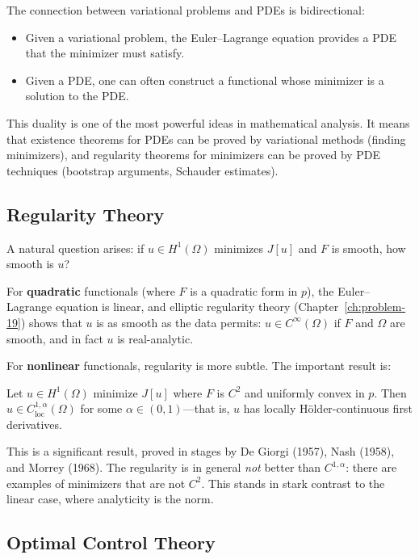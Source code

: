 The connection between variational problems and PDEs is bidirectional:
\begin{itemize}
    \item Given a variational problem, the Euler--Lagrange equation provides a PDE that the minimizer must satisfy.
    \item Given a PDE, one can often construct a functional whose minimizer is a solution to the PDE.
\end{itemize}

This duality is one of the most powerful ideas in mathematical analysis. It means that existence theorems for PDEs can be proved by variational methods (finding minimizers), and regularity theorems for minimizers can be proved by PDE techniques (bootstrap arguments, Schauder estimates).

\subsection{Regularity Theory}

A natural question arises: if $u \in H^1(\Omega)$ minimizes $J[u]$ and $F$ is smooth, how smooth is $u$?

For \textbf{quadratic} functionals (where $F$ is a quadratic form in $p$), the Euler--Lagrange equation is linear, and elliptic regularity theory (Chapter~\ref{ch:problem-19}) shows that $u$ is as smooth as the data permits: $u \in C^\infty(\Omega)$ if $F$ and $\Omega$ are smooth, and in fact $u$ is real-analytic.

For \textbf{nonlinear} functionals, regularity is more subtle. The important result is:

\begin{theorem}\label{thm:interior-regularity}
Let $u \in H^1(\Omega)$ minimize $J[u]$ where $F$ is $C^2$ and uniformly convex in $p$. Then $u \in C^{1,\alpha}_{\mathrm{loc}}(\Omega)$ for some $\alpha \in (0,1)$---that is, $u$ has locally H\"older-continuous first derivatives.
\end{theorem}

This is a significant result, proved in stages by De Giorgi (1957), Nash (1958), and Morrey (1968). The regularity is in general \emph{not} better than $C^{1,\alpha}$: there are examples of minimizers that are not $C^2$. This stands in stark contrast to the linear case, where analyticity is the norm.

\subsection{Optimal Control Theory}

